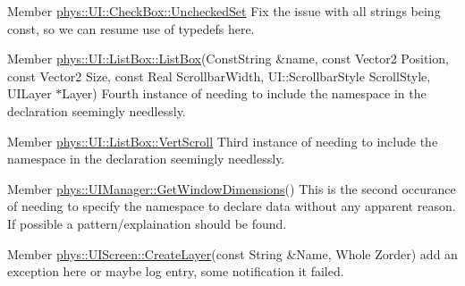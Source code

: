 \label{dd/da0/todo__todo000026}
\hypertarget{dd/da0/todo__todo000026}{}
 
\begin{DoxyDescription}
\item[Member \hyperlink{classphys_1_1UI_1_1CheckBox_a7b670d93f119193283ec78b94f842429}{phys::UI::CheckBox::UncheckedSet} ]Fix the issue with all strings being const, so we can resume use of typedefs here. 
\end{DoxyDescription}

\label{dd/da0/todo__todo000027}
\hypertarget{dd/da0/todo__todo000027}{}
 
\begin{DoxyDescription}
\item[Member \hyperlink{classphys_1_1UI_1_1ListBox_a0bf957f875c9a7c5361c26b5001ce821}{phys::UI::ListBox::ListBox}(ConstString \&name, const Vector2 Position, const Vector2 Size, const Real ScrollbarWidth, UI::ScrollbarStyle ScrollStyle, UILayer $\ast$Layer) ]Fourth instance of needing to include the namespace in the declaration seemingly needlessly. 
\end{DoxyDescription}

\label{dd/da0/todo__todo000028}
\hypertarget{dd/da0/todo__todo000028}{}
 
\begin{DoxyDescription}
\item[Member \hyperlink{classphys_1_1UI_1_1ListBox_ab2b012b345ff4bb1a5b228fef88d895c}{phys::UI::ListBox::VertScroll} ]Third instance of needing to include the namespace in the declaration seemingly needlessly. 
\end{DoxyDescription}

\label{dd/da0/todo__todo000029}
\hypertarget{dd/da0/todo__todo000029}{}
 
\begin{DoxyDescription}
\item[Member \hyperlink{classphys_1_1UIManager_ae56846a64d8ce312aa36a749d15619df}{phys::UIManager::GetWindowDimensions}() ]This is the second occurance of needing to specify the namespace to declare data without any apparent reason. If possible a pattern/explaination should be found. 
\end{DoxyDescription}

\label{dd/da0/todo__todo000030}
\hypertarget{dd/da0/todo__todo000030}{}
 
\begin{DoxyDescription}
\item[Member \hyperlink{classphys_1_1UIScreen_a14c3256bda81d40553ff065993fcbe77}{phys::UIScreen::CreateLayer}(const String \&Name, Whole Zorder) ]add an exception here or maybe log entry, some notification it failed. 
\end{DoxyDescription}


